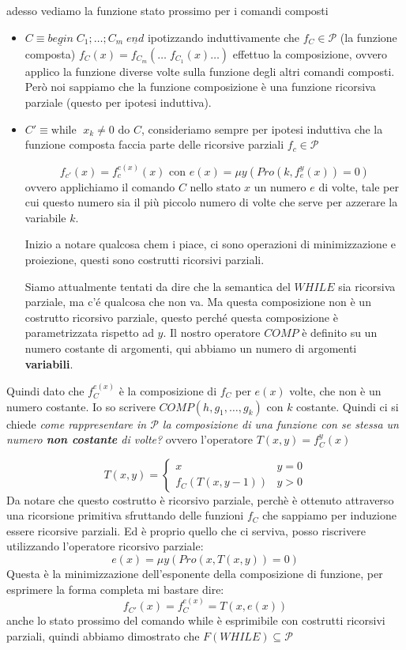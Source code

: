\documentclass{article}
\begin{document}
adesso vediamo la funzione stato prossimo per i comandi composti
\begin{itemize}
    \item $C\equiv \underline{begin}\;C_1;\dots;C_m\;\underline{end}$
          ipotizzando induttivamente che $f_C\in\mathcal{P}$ (la funzione composta)
          $f_C(x)=f_{C_m}(\dots\;f_{C_1}(x)\dots)$
          effettuo la composizione, ovvero applico la funzione diverse volte sulla funzione degli
          altri comandi composti. Però noi sappiamo che la funzione composizione è una funzione
          ricorsiva parziale (questo per ipotesi induttiva).

    \item $C'\equiv\text{while }\;x_k\neq 0\text{ do }C$, consideriamo sempre per ipotesi
          induttiva che la funzione composta faccia parte delle ricorsive parziali $f_c\in\mathcal{P}$

          $$f_{c'}(x)=f_c^{e(x)}(x)\text{ con }e(x)=\mu y(Pro(k,f_e^y(x))=0)$$
          ovvero applichiamo il comando $C$ nello stato $x$ un numero $e$ di volte, tale per cui
          questo numero sia il più piccolo numero di volte che serve per azzerare la variabile $k$.

          Inizio a notare qualcosa chem i piace, ci sono operazioni di minimizzazione e proiezione,
          questi sono costrutti ricorsivi parziali.

          Siamo attualmente tentati da dire che la semantica del $WHILE$ sia ricorsiva parziale, ma
          c'é qualcosa che non va. Ma questa composizione non è un costrutto ricorsivo parziale, questo
          perché questa composizione è parametrizzata rispetto ad $y$. Il nostro operatore $COMP$ è definito
          su un numero costante di argomenti, qui abbiamo un numero di argomenti \textbf{variabili}.
\end{itemize}

Quindi dato che $f_C^{e(x)}$ è la composizione di $f_C$ per $e(x)$ volte, che non è un numero
costante. Io so scrivere $COMP(h,g_1,\dots,g_k)$ con $k$ costante. Quindi ci si chiede
\textit{come rappresentare in $\mathcal{P}$ la composizione di una funzione con se stessa
    un numero \textbf{non costante} di volte?} ovvero l'operatore $T(x,y)=f_C^y(x)$

\[
    T(x,y)=
    \begin{cases}
        x             & y=0 \\
        f_C(T(x,y-1)) & y>0
    \end{cases}
\]
Da notare che questo costrutto è ricorsivo parziale, perchè è ottenuto attraverso una
ricorsione primitiva sfruttando delle funzioni $f_C$ che sappiamo per induzione essere ricorsive
parziali. Ed è proprio quello che ci serviva, posso riscrivere utilizzando l'operatore
ricorsivo parziale:
$$e(x)=\mu y(Pro(x,T(x,y))=0)$$
Questa è la minimizzazione dell'esponente della composizione di funzione, per esprimere
la forma completa mi bastare dire:
$$f_{C'}(x)=f_C^{e(x)}=T(x,e(x))$$
anche lo stato prossimo del comando while è esprimibile con costrutti ricorsivi parziali, quindi
abbiamo dimostrato che $F(WHILE)\subseteq\mathcal{P}$
\end{document}
